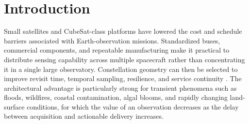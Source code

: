 \documentclass[a4paper,fleqn]{cas-dc}
\begin{document}
\maketitle

\section{Introduction}
Small satellites and CubeSat-class platforms have lowered the cost and schedule barriers associated with Earth-observation missions. Standardized buses, commercial components, and repeatable manufacturing make it practical to distribute sensing capability across multiple spacecraft rather than concentrating it in a single large observatory. Constellation geometry can then be selected to improve revisit time, temporal sampling, resilience, and service continuity \cite{woellert2011cubesats}. The architectural advantage is particularly strong for transient phenomena such as floods, wildfires, coastal contamination, algal blooms, and rapidly changing land-surface conditions, for which the value of an observation decreases as the delay between acquisition and actionable delivery increases.
\end{document}

